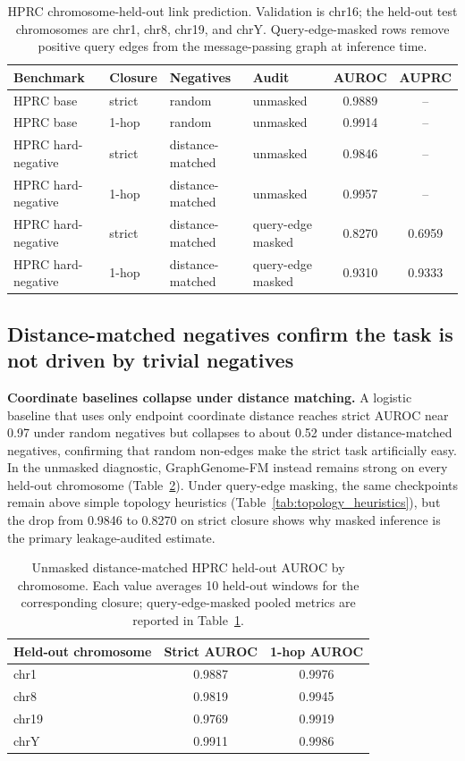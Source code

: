 \IfFileExists{ws-procs11x85.cls}{\worldscientificclasstrue\documentclass{ws-procs11x85}}{\worldscientificclassfalse\documentclass[11pt]{article}\usepackage[margin=1in]{geometry}}
\providecommand{\tbl}[2]{\caption{#1}#2}
\providecommand{\toprule}{\hline}
\providecommand{\colrule}{\hline}
\providecommand{\botrule}{\hline}
\begin{document}
\begin{table}[t]
\tbl{HPRC chromosome-held-out link prediction. Validation is chr16; the held-out
test chromosomes are chr1, chr8, chr19, and chrY. Query-edge-masked rows remove
positive query edges from the message-passing graph at inference time.}
{\begin{tabular}{@{}llllcc@{}}
\toprule
Benchmark & Closure & Negatives & Audit & AUROC & AUPRC\\
\colrule
HPRC base & strict & random & unmasked & 0.9889 & --\\
HPRC base & 1-hop & random & unmasked & 0.9914 & --\\
HPRC hard-negative & strict & distance-matched & unmasked & 0.9846 & --\\
HPRC hard-negative & 1-hop & distance-matched & unmasked & 0.9957 & --\\
HPRC hard-negative & strict & distance-matched & query-edge masked & 0.8270 & 0.6959\\
HPRC hard-negative & 1-hop & distance-matched & query-edge masked & 0.9310 & 0.9333\\
\botrule
\end{tabular}}
\label{tab:hprc_pretrain}
\end{table}

\subsection{Distance-matched negatives confirm the task is not driven by trivial
negatives}
\label{sec:robustness}

\textbf{Coordinate baselines collapse under distance matching.} A logistic
baseline that uses only endpoint coordinate distance reaches strict AUROC near
0.97 under random negatives but collapses to about 0.52 under distance-matched
negatives, confirming that random non-edges make the strict task artificially
easy. In the unmasked diagnostic, GraphGenome-FM instead remains strong on every
held-out chromosome (Table~\ref{tab:hprc_per_chrom}). Under query-edge masking,
the same checkpoints remain above simple topology heuristics
(Table~\ref{tab:topology_heuristics}), but the drop from 0.9846 to 0.8270 on
strict closure shows why masked inference is the primary leakage-audited
estimate.

\begin{table}[t]
\tbl{Unmasked distance-matched HPRC held-out AUROC by chromosome. Each value
averages 10 held-out windows for the corresponding closure; query-edge-masked
pooled metrics are reported in Table~\ref{tab:hprc_pretrain}.}
{\begin{tabular}{@{}lcc@{}}
\toprule
Held-out chromosome & Strict AUROC & 1-hop AUROC\\
\colrule
chr1  & 0.9887 & 0.9976\\
chr8  & 0.9819 & 0.9945\\
chr19 & 0.9769 & 0.9919\\
chrY  & 0.9911 & 0.9986\\
\botrule
\end{tabular}}
\label{tab:hprc_per_chrom}
\end{table}
\end{document}
